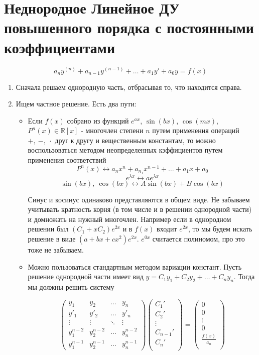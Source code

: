 \documentclass[11pt]{article}
\begin{document}
	\section{Неднородное Линейное ДУ повышенного порядка с постоянными коэффициентами}
	$$a_{n} y^{(n)} +a_{n-1} y^{(n-1)} + \dots + a_{1} y' + a_{0} y = f(x) $$
	\begin{enumerate}
		\item Сначала решаем однородную часть, отбрасывая то, что находится справа.
		\item Ищем частное решение. Есть два пути:
			\begin{itemize}
				\item Если $f(x)$ собрано из функций $e^{ax}$, $\sin(bx)$, $\cos(mx)$, $P^n (x) \in \mathbb{R}[x]$ - многочлен степени $n$ путем применения операций $+,\ -,\ \cdot$ друг к другу и вещественным константам, то можно воспользоваться методом неопределенных кэффициентов путем применения соответствий
				$$P^n (x) \leftrightarrow a_n x^n + a_{n_1} x^{n-1} + \dots + a_1 x + a_0$$
				$$e^{\lambda x} \leftrightarrow ae^{\lambda x}$$
				$$\sin(bx),\ \cos (bx) \leftrightarrow A\sin(bx) + B\cos(bx)$$
				
				Синус и косинус одинаково представляются в общем виде. Не забываем учитывать кратность корня (в том числе и в решении однородной части) и домножать на нужный многочлен. Например если в однородном решении был $(C_1 + xC_2)e^{2x}$ и в $f(x)$ входит $e^{2x}$, то мы будем искать решение в виде $(a + bx + cx^2)e^{2x}$. $e^{0x}$ считается полиномом, про это тоже не забываем.
				\item Можно пользоваться стандартным методом вариации констант. Пусть решение однородной части имеет вид $y = C_1 y_1 +C_2 y_2 +\dots + C_n y_n$. Тогда мы должны решить систему
				
				$$\begin{pmatrix}
				y_1 & y_2 & \dots & y_n\\
				y'_1 & y'_2 & \dots & y'_n\\
				\vdots & \vdots & \ddots & \vdots\\
				y_1^{n-2} & y_2^{n-2} & \dots & y_n^{n-2}\\
				y_1^{n-1} & y_2^{n-1} & \dots & y_n^{n-1}
				\end{pmatrix}
				\begin{pmatrix}
				C_1'\\
				C_2'\\
				\vdots\\
				C_{n-1}'\\
				C_n'\\
				\end{pmatrix}=
				\begin{pmatrix}
				0\\
				0\\
				\vdots\\
				0\\
				\frac{f(x)}{a_n}\\
				\end{pmatrix}
				$$
				

\end{itemize}
\end{enumerate}
\end{document}
